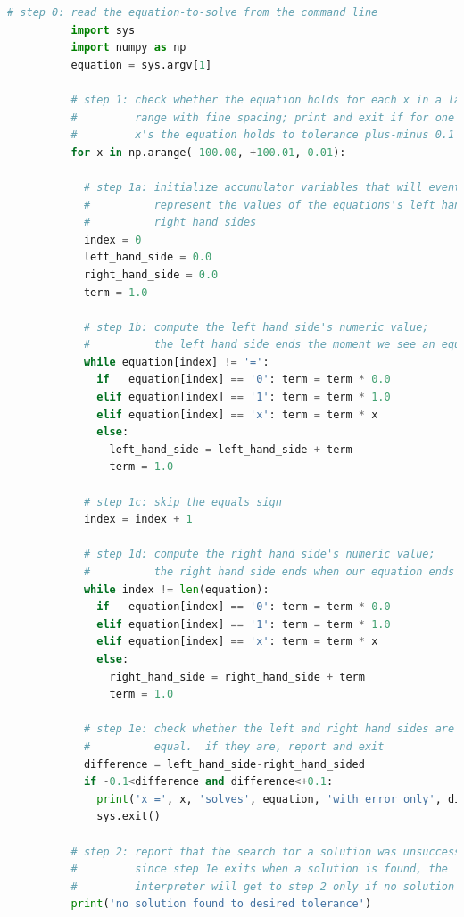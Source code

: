 \documentclass[11pt, justified]{tufte-book}
\theoremstyle{definition}
\begin{document}
        \begin{lstlisting}[language=Python, basicstyle=\footnotesize\ttfamily]
          # step 0: read the equation-to-solve from the command line
          import sys
          import numpy as np
          equation = sys.argv[1]

          # step 1: check whether the equation holds for each x in a large
          #         range with fine spacing; print and exit if for one of these
          #         x's the equation holds to tolerance plus-minus 0.1 
          for x in np.arange(-100.00, +100.01, 0.01): 

            # step 1a: initialize accumulator variables that will eventually
            #          represent the values of the equations's left hand and
            #          right hand sides
            index = 0
            left_hand_side = 0.0
            right_hand_side = 0.0
            term = 1.0

            # step 1b: compute the left hand side's numeric value; 
            #          the left hand side ends the moment we see an equals sign
            while equation[index] != '=':
              if   equation[index] == '0': term = term * 0.0
              elif equation[index] == '1': term = term * 1.0
              elif equation[index] == 'x': term = term * x 
              else:
                left_hand_side = left_hand_side + term
                term = 1.0

            # step 1c: skip the equals sign
            index = index + 1

            # step 1d: compute the right hand side's numeric value;
            #          the right hand side ends when our equation ends 
            while index != len(equation):
              if   equation[index] == '0': term = term * 0.0
              elif equation[index] == '1': term = term * 1.0
              elif equation[index] == 'x': term = term * x 
              else:
                right_hand_side = right_hand_side + term
                term = 1.0

            # step 1e: check whether the left and right hand sides are nearly
            #          equal.  if they are, report and exit 
            difference = left_hand_side-right_hand_sided
            if -0.1<difference and difference<+0.1:
              print('x =', x, 'solves', equation, 'with error only', difference)
              sys.exit()

          # step 2: report that the search for a solution was unsuccessful.
          #         since step 1e exits when a solution is found, the
          #         interpreter will get to step 2 only if no solution is found
          print('no solution found to desired tolerance')
        \end{lstlisting}
\end{document}
